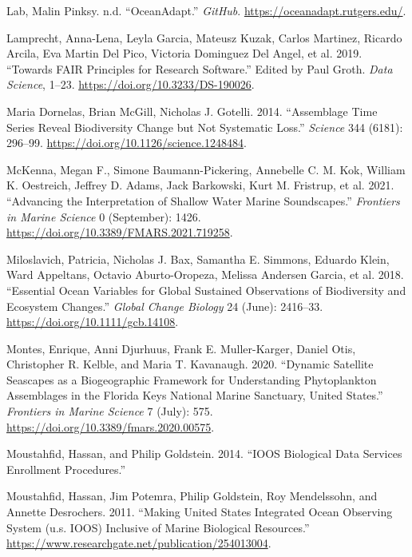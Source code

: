 \documentclass[
]{book}
\newlength{\cslhangindent}
\newlength{\cslentryspacingunit} %
\newenvironment{CSLReferences}[2] %
 {%
  \setlength{\parindent}{0pt}
  \ifodd #1
  \let\oldpar\par
  \def\par{\hangindent=\cslhangindent\oldpar}
  \fi
  \setlength{\parskip}{#2\cslentryspacingunit}
 }%
 {}
\begin{document}
\begin{CSLReferences}{1}{0}
\leavevmode{}%
Lab, Malin Pinksy. n.d. {``OceanAdapt.''} \emph{GitHub}. \url{https://oceanadapt.rutgers.edu/}.

\leavevmode{}%
Lamprecht, Anna-Lena, Leyla Garcia, Mateusz Kuzak, Carlos Martinez, Ricardo Arcila, Eva Martin Del Pico, Victoria Dominguez Del Angel, et al. 2019. {``Towards FAIR Principles for Research Software.''} Edited by Paul Groth. \emph{Data Science}, 1--23. \url{https://doi.org/10.3233/DS-190026}.

\leavevmode{}%
Maria Dornelas, Brian McGill, Nicholas J. Gotelli. 2014. {``Assemblage Time Series Reveal Biodiversity Change but Not Systematic Loss.''} \emph{Science} 344 (6181): 296--99. \url{https://doi.org/10.1126/science.1248484}.

\leavevmode{}%
McKenna, Megan F., Simone Baumann-Pickering, Annebelle C. M. Kok, William K. Oestreich, Jeffrey D. Adams, Jack Barkowski, Kurt M. Fristrup, et al. 2021. {``Advancing the Interpretation of Shallow Water Marine Soundscapes.''} \emph{Frontiers in Marine Science} 0 (September): 1426. \url{https://doi.org/10.3389/FMARS.2021.719258}.

\leavevmode{}%
Miloslavich, Patricia, Nicholas J. Bax, Samantha E. Simmons, Eduardo Klein, Ward Appeltans, Octavio Aburto-Oropeza, Melissa Andersen Garcia, et al. 2018. {``Essential Ocean Variables for Global Sustained Observations of Biodiversity and Ecosystem Changes.''} \emph{Global Change Biology} 24 (June): 2416--33. \url{https://doi.org/10.1111/gcb.14108}.

\leavevmode{}%
Montes, Enrique, Anni Djurhuus, Frank E. Muller-Karger, Daniel Otis, Christopher R. Kelble, and Maria T. Kavanaugh. 2020. {``Dynamic Satellite Seascapes as a Biogeographic Framework for Understanding Phytoplankton Assemblages in the Florida Keys National Marine Sanctuary, United States.''} \emph{Frontiers in Marine Science} 7 (July): 575. \url{https://doi.org/10.3389/fmars.2020.00575}.

\leavevmode{}%
Moustahfid, Hassan, and Philip Goldstein. 2014. {``IOOS Biological Data Services Enrollment Procedures.''}

\leavevmode{}%
Moustahfid, Hassan, Jim Potemra, Philip Goldstein, Roy Mendelssohn, and Annette Desrochers. 2011. {``Making United States Integrated Ocean Observing System (u.s. IOOS) Inclusive of Marine Biological Resources.''} \url{https://www.researchgate.net/publication/254013004}.


\end{CSLReferences}
\end{document}
